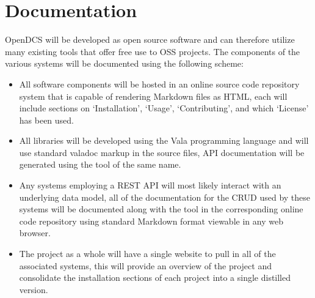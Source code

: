 \documentclass[11pt]{article}
\begin{document}



  \section{Documentation}\label{sec:doc}

    OpenDCS will be developed as open source software and can therefore
    utilize many existing tools that offer free use to OSS projects. The
    components of the various systems will be documented using the following
    scheme:

    \begin{itemize}
      \item All software components will be hosted in an online source code
            repository system that is capable of rendering Markdown files as
            HTML, each will include sections on `Installation', `Usage',
            `Contributing', and which `License' has been used.
      \item All libraries will be developed using the Vala programming language
            and will use standard valadoc markup in the source files, API
            documentation will be generated using the tool of the same name.
      \item Any systems employing a REST API will most likely interact with an
            underlying data model, all of the documentation for the CRUD used
            by these systems will be documented along with the tool in the
            corresponding online code repository using standard Markdown format
            viewable in any web browser.
      \item The project as a whole will have a single website to pull in all of
            the associated systems, this will provide an overview of the
            project and consolidate the installation sections of each project
            into a single distilled version.
    \end{itemize}
\end{document}

